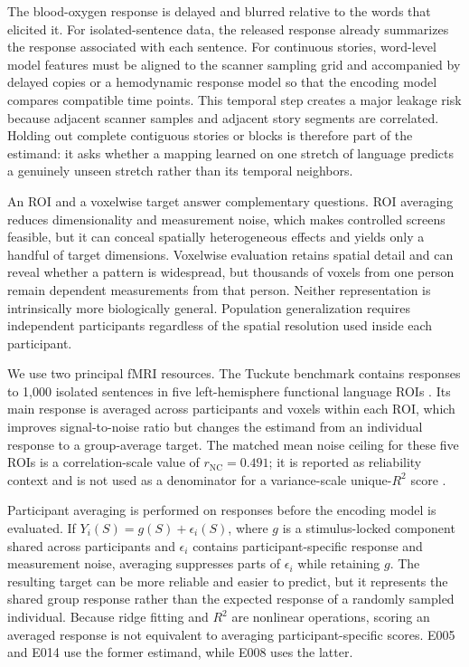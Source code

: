 The blood-oxygen response is delayed and blurred relative to the words that elicited it.
For isolated-sentence data, the released response already summarizes the response associated with each sentence.
For continuous stories, word-level model features must be aligned to the scanner sampling grid and accompanied by delayed copies or a hemodynamic response model so that the encoding model compares compatible time points.
This temporal step creates a major leakage risk because adjacent scanner samples and adjacent story segments are correlated.
Holding out complete contiguous stories or blocks is therefore part of the estimand: it asks whether a mapping learned on one stretch of language predicts a genuinely unseen stretch rather than its temporal neighbors.

An ROI and a voxelwise target answer complementary questions.
ROI averaging reduces dimensionality and measurement noise, which makes controlled screens feasible, but it can conceal spatially heterogeneous effects and yields only a handful of target dimensions.
Voxelwise evaluation retains spatial detail and can reveal whether a pattern is widespread, but thousands of voxels from one person remain dependent measurements from that person.
Neither representation is intrinsically more biologically general.
Population generalization requires independent participants regardless of the spatial resolution used inside each participant.

We use two principal fMRI resources.
The Tuckute benchmark contains responses to 1,000 isolated sentences in five left-hemisphere functional language ROIs \autocite{tuckute2024}.
Its main response is averaged across participants and voxels within each ROI, which improves signal-to-noise ratio but changes the estimand from an individual response to a group-average target.
The matched mean noise ceiling for these five ROIs is a correlation-scale value of $r_{\mathrm{NC}}=0.491$; it is reported as reliability context and is not used as a denominator for a variance-scale unique-$R^2$ score .

Participant averaging is performed on responses before the encoding model is evaluated.
If $Y_i(S)=g(S)+\epsilon_i(S)$, where $g$ is a stimulus-locked component shared across participants and $\epsilon_i$ contains participant-specific response and measurement noise, averaging suppresses parts of $\epsilon_i$ while retaining $g$.
The resulting target can be more reliable and easier to predict, but it represents the shared group response rather than the expected response of a randomly sampled individual.
Because ridge fitting and $R^2$ are nonlinear operations, scoring an averaged response is not equivalent to averaging participant-specific scores.
E005 and E014 use the former estimand, while E008 uses the latter.

